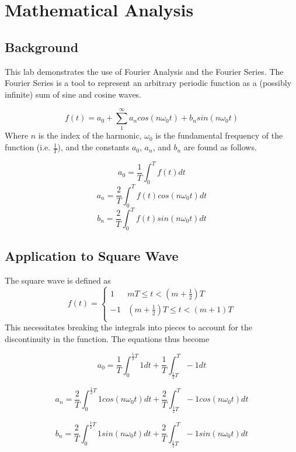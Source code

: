 \documentclass[a4paper,titlepage]{article}
\begin{document}
	\section{Mathematical Analysis}
	\subsection{Background}
	This lab demonstrates the use of Fourier Analysis and the Fourier Series. The Fourier Series is a tool to represent an arbitrary periodic function as a (possibly infinite) sum of sine and cosine waves.
	
	$$f(t) = a_0 + \sum_{1}^{\infty} a_n cos(n \omega_0 t) + b_n sin(n \omega_0 t)$$ 
	Where $n$ is the index of the harmonic, $\omega_0$ is the fundamental frequency of the function (i.e. $\frac{1}{T}$), and the constants $a_0$, $a_n$, and $b_n$ are found as follows.
	
	$$a_0 = \frac{1}{T} \int_{0}^{T}f(t)dt$$
	$$a_n = \frac{2}{T} \int_{0}^{T}f(t) cos(n \omega_0 t)dt$$
	$$b_n = \frac{2}{T} \int_{0}^{T}f(t) sin(n \omega_0 t)dt$$
	\subsection{Application to Square Wave}
	The square wave is defined as
	\[ f(t) =  \begin{cases}
	1 & mT \leq t < (m + \frac{1}{2})T \\
	-1 & (m + \frac{1}{2})T \leq t < (m + 1)T \\
	\end{cases}
	\]
	This necessitates breaking the integrals into pieces to account for the discontinuity in the function. The equations thus become
	
	$$a_0 = \frac{1}{T} \int_{0}^{\frac{1}{2}T}1dt + \frac{1}{T} \int_{\frac{1}{2}T}^{T} -1dt$$ 
	
	$$a_n = \frac{2}{T} \int_{0}^{\frac{1}{2}T}1cos(n \omega_0 t)dt + \frac{2}{T} \int_{\frac{1}{2}T}^{T}-1cos(n \omega_0 t)dt $$
	
	$$b_n = \frac{2}{T} \int_{0}^{\frac{1}{2}T}1sin(n \omega_0 t)dt + \frac{2}{T} \int_{\frac{1}{2}T}^{T} -1sin(n \omega_0 t)dt $$
\end{document}
